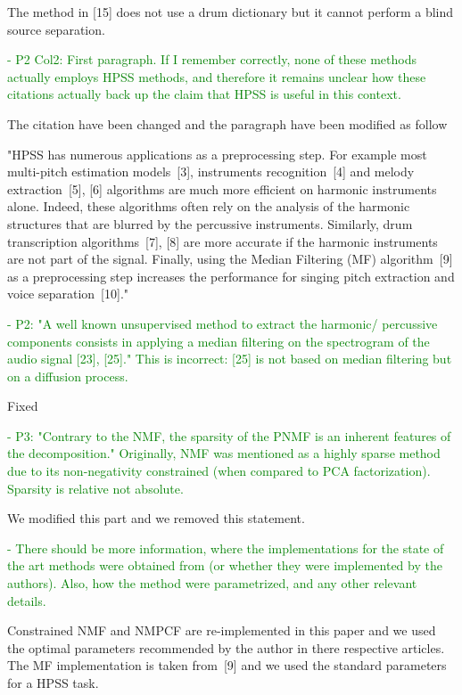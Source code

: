 \documentclass[]{article}
\begin{document}
The method in [15] does not use a drum dictionary but it cannot perform a blind source separation. 

\textcolor{green}{- P2 Col2: First paragraph. If I remember correctly, none of these methods actually employs HPSS methods, and therefore it remains unclear how these citations actually back up the claim that HPSS is useful in this context.}

The citation have been changed and the paragraph have been modified as follow 

"HPSS has numerous applications as a preprocessing step. For example most multi-pitch estimation models~[3], instruments recognition~[4] and melody extraction~[5], [6] algorithms are much more efficient on harmonic instruments alone. Indeed, these algorithms often rely on the analysis of the harmonic structures that are blurred by the percussive instruments. Similarly, drum transcription algorithms~[7], [8] are more accurate if the harmonic instruments are not part of the signal. Finally, using the Median Filtering (MF) algorithm~[9] as a preprocessing step increases the performance for singing pitch extraction and voice separation~[10]."


\textcolor{green}{- P2: "A well known unsupervised method to extract the harmonic/ percussive components consists in applying a median filtering on the spectrogram of the audio signal [23], [25]." This is incorrect: [25] is not based on median filtering but on a diffusion process.}

Fixed

\textcolor{green}{- P3: "Contrary to the NMF, the sparsity of the PNMF is an inherent features of the decomposition." Originally, NMF was mentioned as a highly sparse method due to its non-negativity constrained (when compared to PCA factorization). Sparsity is relative not absolute.}

We modified this part and we removed this statement. 

\textcolor{green}{- There should be more information, where the implementations for the state of the art methods were obtained from (or whether they were implemented by the authors). Also, how the method were parametrized, and any other relevant details.}

Constrained NMF and NMPCF are re-implemented in this paper and we used the optimal parameters recommended by the author in there respective articles. The MF implementation is taken from~[9] and we used the standard parameters for a HPSS task.
\end{document}
